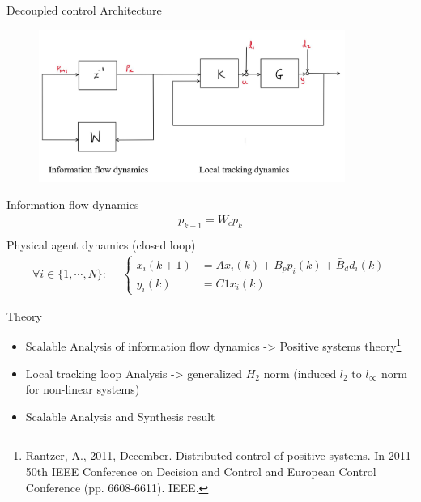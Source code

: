 \begin{frame}{Decoupled control Architecture}
	\begin{figure}[h!]
		\includegraphics[width=10cm]{doc/2_Formation_control/decoupled_architecture.jpg}
		\label{fig:control_arch}	
	\end{figure}
Information flow dynamics
	\begin{equation*}\label{eqn:perturbed_information_flow_dynamics}
	\begin{split}
	p_{k+1}=W_cp_k \\
	\end{split}
	\end{equation*}
Physical agent dynamics (closed loop)	
	\begin{equation*}
	\begin{split}	
	\forall i \in \{1,\cdots, N\}:
	~~&\left\{
	\begin{array}{ll}
	x_i(k+1)&=Ax_i(k)+B_pp_i(k) + \bar{B}_dd_i(k) \\
	y_i(k) &=C1x_i(k) 
	\end{array}
	\right.
	\end{split}
	\end{equation*}
\end{frame}
\begin{frame}{Theory}
\begin{itemize}
	\item Scalable Analysis of information flow dynamics -> Positive systems theory\footnote{Rantzer, A., 2011, December. Distributed control of positive systems. In 2011 50th IEEE Conference on Decision and Control and European Control Conference (pp. 6608-6611). IEEE.}
	\item Local tracking loop Analysis -> generalized $H_2$ norm (induced $l_2$ to $l_{\infty}$ norm for non-linear systems)
	\item Scalable Analysis and Synthesis result
\end{itemize}
\end{frame}
